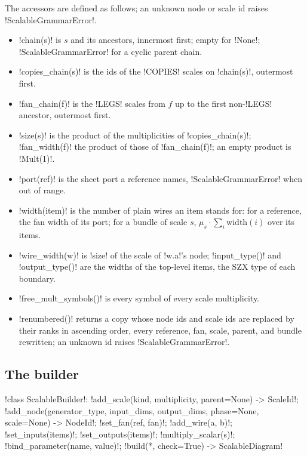 The accessors are defined as follows; an unknown node or scale id raises \py!ScalableGrammarError!.
\begin{itemize}
\item \py!chain(s)! is $s$ and its ancestors, innermost first; empty for \py!None!; \py!ScalableGrammarError! for a cyclic parent chain.
\item \py!copies_chain(s)! is the ids of the \code!COPIES! scales on \py!chain(s)!, outermost first.
\item \py!fan_chain(f)! is the \code!LEGS! scales from $f$ up to the first non-\code!LEGS! ancestor, outermost first.
\item \py!size(s)! is the product of the multiplicities of \py!copies_chain(s)!; \py!fan_width(f)! the product of those of \py!fan_chain(f)!; an empty product is \py!Mult(1)!.
\item \py!port(ref)! is the sheet port a reference names, \py!ScalableGrammarError! when out of range.
\item \py!width(item)! is the number of plain wires an item stands for: for a reference, the fan width of its port; for a bundle of scale $s$, $\mu_s\cdot\sum_{i}\mathrm{width}(i)$ over its items.
\item \py!wire_width(w)! is \py!size! of the scale of \py!w.a!'s node; \py!input_type()! and \py!output_type()! are the widths of the top-level items, the SZX type of each boundary.
\item \py!free_mult_symbols()! is every symbol of every scale multiplicity.
\item \py!renumbered()! returns a copy whose node ids and scale ids are replaced by their ranks in ascending order, every reference, fan, scale, parent, and bundle rewritten; an unknown id raises \py!ScalableGrammarError!.
\end{itemize}

\subsection{The builder}

\begin{signature}
\py!class ScalableBuilder!: \py!add_scale(kind, multiplicity, parent=None) -> ScaleId!; \py!add_node(generator_type, input_dims, output_dims, phase=None, scale=None) -> NodeId!; \py!set_fan(ref, fan)!; \py!add_wire(a, b)!; \py!set_inputs(items)!; \py!set_outputs(items)!; \py!multiply_scalar(s)!; \py!bind_parameter(name, value)!; \py!build(*, check=True) -> ScalableDiagram!
\end{signature}

